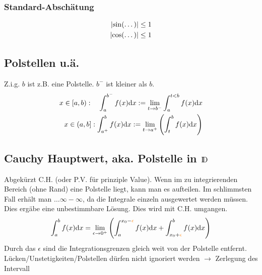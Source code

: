 \subsubsection{Standard-Abschätung}
\begin{align*}
\lvert \sin({\dots)}\rvert&\leq1\\
\lvert \cos({\dots)}\rvert&\leq1\\
\end{align*}

\subsection{Polstellen u.ä.}
Z.i.g. $b$ ist z.B. eine Polstelle. $b^-$ ist kleiner als $b$.
\begin{align}
x\in\left[a,b\right):\quad \int^{b^-}_a f(x)\mathrm{d}x:=\lim_{t\rightarrow b^-} \int^{t<b}_af(x)\mathrm{d}x\\
x\in\left(a,b\right]:\int^b_{a^+}f(x)\mathrm{d}x:= \lim_{t\rightarrow a^+}\left(\int^b_tf(x)\mathrm{d}x\right)
\end{align}

\subsection{Cauchy Hauptwert, aka. Polstelle in $\text{\rmfamily I\!D}$}
Abgekürzt C.H. (oder P.V. für prinziple Value). Wenn im zu integrierenden Bereich (ohne Rand) eine
Polstelle liegt, kann man es aufteilen. Im schlimmsten Fall erhält man $\dots \infty -\infty$, da die Integrale einzeln ausgewertet werden müssen. Dies ergäbe eine unbestimmbare Lösung.  Dies wird mit C.H. umgangen.
\begin{align*}
\int^b_a f(x)\dx=\lim_{\epsilon\rightarrow 0^+}\left(\int^{x_0-{\color{orange}\epsilon}}_a f(x)\dx +\int^b_ {x_0+{\color{orange}\epsilon}}f(x)\dx \right)
\end{align*}
Durch das $\epsilon$ sind die Integrationsgrenzen gleich weit von der Polstelle entfernt.\\
{\color{red}Lücken/Unstetigkeiten/Polstellen dürfen nicht ignoriert werden $\rightarrow$ Zerlegung des Intervall}